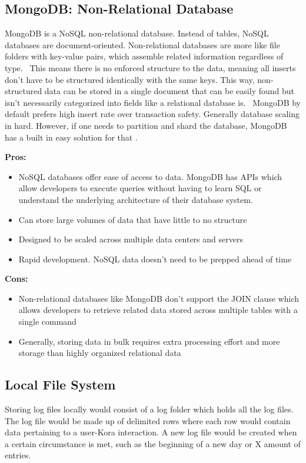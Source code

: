 \documentclass[onecolumn, draftclsnofoot,10pt, compsoc]{IEEEtran}
\begin{document}
		\subsection{MongoDB: Non-Relational Database}
			MongoDB is a NoSQL non-relational database.
			Instead of tables, NoSQL databases are document-oriented.
			Non-relational databases are more like file folders with key-value pairs, which assemble related information regardless of type. 
			This means there is no enforced structure to the data, meaning all inserts don't have to be structured identically with the same keys.
			This way, non-structured data can be stored in a single document that can be easily found but isn't necessarily categorized into fields like a relational database is. 
			MongoDB by default prefers high insert rate over transaction safety. 
			Generally database scaling in hard.
			However, if one needs to partition and shard the database, MongoDB has a built in easy solution for that \cite{SQLvsNoSQLupwork}.
			
			\textbf{Pros:}
				\begin{itemize}
					\item{
						NoSQL databases offer ease of access to data.
						MongoDB has APIs which allow developers to execute queries without having to learn SQL or understand the underlying architecture of their database system.}
					\item{
						Can store large volumes of data that have little to no structure} 
					\item{
						Designed to be scaled across multiple data centers and servers}
					\item{ 
						Rapid development. NoSQL data doesn’t need to be prepped ahead of time \cite{SQLvsNoSQLupwork}}
				\end{itemize}
			
			\textbf{Cons:}
				\begin{itemize}
					\item{ 
						Non-relational databases like MongoDB don't support the JOIN clause which allows developers to retrieve related data stored across multiple tables with a single command}
					\item{
						Generally, storing data in bulk requires extra processing effort and more storage than highly organized relational data \cite{SQLvsNoSQLupwork}}
				\end{itemize}

			
		\subsection{Local File System}
			Storing log files locally would consist of a log folder which holds all the log files.
			The log file would be made up of delimited rows where each row would contain data pertaining to a user-Kora interaction.
			A new log file would be created when a certain circumstance is met, such as the beginning of a new day or X amount of entries.
			
\end{document}
